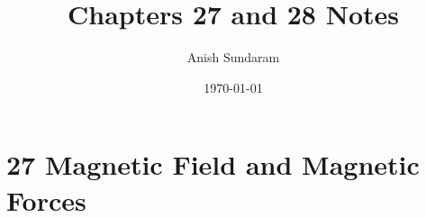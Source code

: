 \documentclass[12pt]{amsart}
\title{Chapters 27 and 28 Notes}
\author{Anish Sundaram}
\date{\today}
\theoremstyle{definition}
\numberwithin{equation}{theorem}    %
\begin{document}
\maketitle

\tableofcontents

\section*{27 Magnetic Field and Magnetic Forces}
\end{document}
